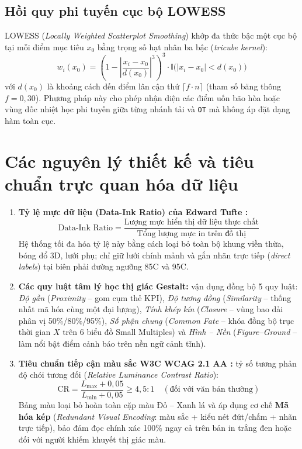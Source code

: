 \documentclass[12pt,a4paper,oneside]{report}
\newcommand{\dC}{\textdegree C\xspace}
\newcommand{\code}[1]{\texttt{#1}}
\begin{document}
\subsection{Hồi quy phi tuyến cục bộ LOWESS}

LOWESS (\textit{Locally Weighted Scatterplot Smoothing}) \cite{cleveland1979lowess} khớp đa thức bậc một cục bộ tại mỗi điểm mục tiêu $x_0$ bằng trọng số hạt nhân ba bậc (\textit{tricube kernel}):
\begin{equation}
  w_i(x_0) = \left(1 - \left|\frac{x_i - x_0}{d(x_0)}\right|^3\right)^3 \cdot \mathbb{I}\bigl(|x_i - x_0| < d(x_0)\bigr)
\end{equation}
với $d(x_0)$ là khoảng cách đến điểm lân cận thứ $\lceil f \cdot n \rceil$ (tham số băng thông $f = 0{,}30$). Phương pháp này cho phép nhận diện các điểm uốn bão hòa hoặc vùng dốc nhiệt học phi tuyến giữa từng nhánh tải và \code{OT} mà không áp đặt dạng hàm toàn cục.

\section{Các nguyên lý thiết kế và tiêu chuẩn trực quan hóa dữ liệu}

\begin{enumerate}
  \item \textbf{Tỷ lệ mực dữ liệu (Data-Ink Ratio) của Edward Tufte \cite{tufte2001}:}
  \begin{equation}
    \text{Data-Ink Ratio} = \frac{\text{Lượng mực hiển thị dữ liệu thực chất}}{\text{Tổng lượng mực in trên đồ thị}}
  \end{equation}
  Hệ thống tối đa hóa tỷ lệ này bằng cách loại bỏ toàn bộ khung viền thừa, bóng đổ 3D, lưới phụ; chỉ giữ lưới chính mảnh và gắn nhãn trực tiếp (\textit{direct labels}) tại biên phải đường ngưỡng 85\dC và 95\dC.
  \item \textbf{Các quy luật tâm lý học thị giác Gestalt:} vận dụng đồng bộ 5 quy luật: \textit{Độ gần} (\textit{Proximity} -- gom cụm thẻ KPI), \textit{Độ tương đồng} (\textit{Similarity} -- thống nhất mã hóa cùng một đại lượng), \textit{Tính khép kín} (\textit{Closure} -- vùng bao dải phân vị 50\%/80\%/95\%), \textit{Số phận chung} (\textit{Common Fate} -- khóa đồng bộ trục thời gian $X$ trên 6 biểu đồ Small Multiples) và \textit{Hình -- Nền} (\textit{Figure--Ground} -- làm nổi bật điểm cảnh báo trên nền ngữ cảnh tĩnh).
  \item \textbf{Tiêu chuẩn tiếp cận màu sắc W3C WCAG 2.1 AA \cite{wcag21}:} tỷ số tương phản độ chói tương đối (\textit{Relative Luminance Contrast Ratio}):
  \begin{equation}
    \text{CR} = \frac{L_{\max} + 0{,}05}{L_{\min} + 0{,}05} \ge 4{,}5 : 1 \quad (\text{đối với văn bản thường})
  \end{equation}
  Bảng màu loại bỏ hoàn toàn cặp màu Đỏ -- Xanh lá và áp dụng cơ chế \textbf{Mã hóa kép} (\textit{Redundant Visual Encoding}: màu sắc + kiểu nét đứt/chấm + nhãn trực tiếp), bảo đảm đọc chính xác 100\% ngay cả trên bản in trắng đen hoặc đối với người khiếm khuyết thị giác màu.
\end{enumerate}
\end{document}
